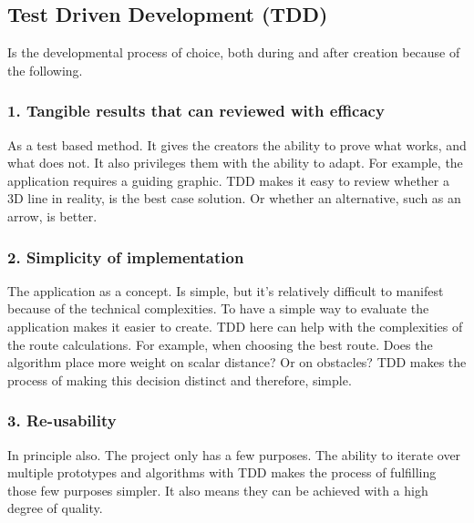 
\subsection*{Test Driven Development (TDD)}

Is the developmental process of choice, both during and after creation because of the following. 
\subsubsection{1. Tangible results that can reviewed with efficacy}
As a test based method. It gives the creators the ability to prove what works, and what does not. It also privileges them with the ability to adapt. For example, the application requires a guiding graphic. TDD makes it easy to review whether a 3D line in reality, is the best case solution. Or whether an alternative, such as an arrow, is better.
\subsubsection{2. Simplicity of implementation}
The application as a concept. Is simple, but it's relatively difficult to manifest because of the technical complexities. To have a simple way to evaluate the application makes it easier to create. TDD here can help with the complexities of the route calculations. For example, when choosing the best route. Does the algorithm place more weight on scalar distance? Or on obstacles? TDD makes the process of making this decision distinct and therefore, simple.
\subsubsection{3. Re-usability}
In principle also. The project only has a few purposes. The ability to iterate over multiple prototypes and algorithms with TDD makes the process of fulfilling those few purposes simpler. It also means they can be achieved with a high degree of quality.